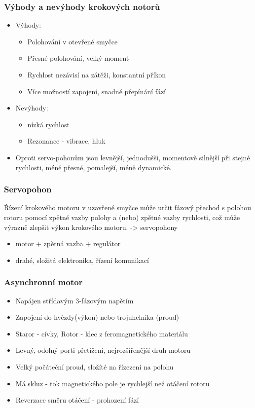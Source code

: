 \subsubsection*{Výhody a nevýhody krokových notorů}
\begin{itemize}
  \item Výhody: \begin{itemize}
    \item Polohování v otevřené smyčce
    \item Přesné polohování, velký moment
    \item Rychlost nezávisí na zátěži, konstantní příkon
    \item Více možností zapojení, snadné přepínání fází
  \end{itemize}
  \item Nevýhody: \begin{itemize}
    \item nízká rychlost
    \item Rezonance - vibrace, hluk
  \end{itemize}
  \item Oproti servo-pohonům jsou levnější, jednodušší, momentově silnější při stejné rychlosti, méně přesné, pomalejší, méně dynamické.
\end{itemize}

\subsubsection*{Servopohon}
Řízení krokového motoru v uzavřené smyčce může určit fázový přechod s polohou rotoru pomocí zpětné vazby polohy a (nebo) zpětné vazby rychlosti, což může výrazně zlepšit výkon krokového motoru. -> servopohony
\begin{itemize}
  \item motor + zpětná vazba + regulátor
  \item drahé, složitá elektronika, řízení komunikací
\end{itemize}

\subsubsection*{Asynchronní motor}
\begin{itemize}
  \item Napájen střídavým 3-fázovým napětím
  \item Zapojení do hvězdy(výkon) nebo trojuhelníka (proud)
  \item Staror - cívky, Rotor - klec z feromagnetického materiálu
  \item Levný, odolný porti přetížení, nejrozšířenější druh motoru
  \item Velký počáteční proud, složíté na řízezení na polohu
  \item Má skluz - tok magnetického pole je rychlejší než otáčení rotoru
  \item Reverzace směru otáčení - prohození fází
\end{itemize}

